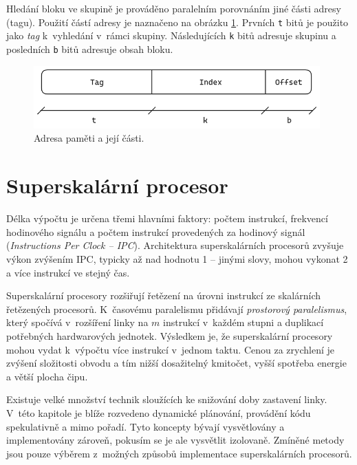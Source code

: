 Hledání bloku ve skupině je prováděno paralelním porovnáním jiné části adresy (tagu).
Použití částí adresy je naznačeno na obrázku \ref{cachelineaddress}.
Prvních \texttt{t} bitů je použito jako \emph{tag} k~vyhledání v~rámci skupiny.
Následujících \texttt{k} bitů adresuje skupinu a posledních \texttt{b} bitů adresuje obsah bloku.

\begin{figure}[ht]\centering
  \includegraphics[width=11cm]{obrazky-figures/cacheline.png}
  \caption{Adresa paměti a její části.}
  \label{cachelineaddress}
\end{figure}


\chapter{Superskalární procesor}
\label{superscalarchapter}

Délka výpočtu je určena třemi hlavními faktory: počtem instrukcí, frekvencí hodinového signálu a počtem instrukcí provedených za hodinový signál (\emph{Instructions Per Clock -- IPC}).
Architektura superskalárních procesorů zvyšuje výkon zvýšením IPC, typicky až nad hodnotu 1 -- jinými slovy, mohou vykonat 2 a více instrukcí ve stejný čas. \cite{QuantApproach}

Superskalární procesory rozšiřují řetězení na úrovni instrukcí ze skalárních řetězených procesorů.
K~časovému paralelismu přidávají \emph{prostorový paralelismus}, který spočívá v~rozšíření linky na $m$ instrukcí v~každém stupni a duplikací potřebných hardwarových jednotek.
Výsledkem je, že superskalární procesory mohou vydat k~výpočtu více instrukcí v~jednom taktu.
Cenou za zrychlení je zvýšení složitosti obvodu a tím nižší dosažitelný kmitočet, vyšší spotřeba energie a větší plocha čipu.

Existuje velké množství technik sloužících ke snižování doby zastavení linky.
V~této kapitole je blíže rozvedeno dynamické plánování, provádění kódu spekulativně a mimo pořadí.
Tyto koncepty bývají vysvětlovány a implementovány zároveň, pokusím se je ale vysvětlit izolovaně.
Zmíněné metody jsou pouze výběrem z~možných způsobů implementace superskalárních procesorů.

